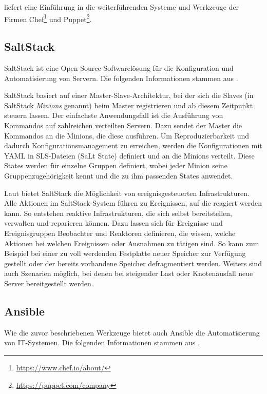 \autocite{chef-vs-puppet-revisited:online} liefert eine Einführung in die weiterführenden Systeme und Werkzeuge der Firmen Chef\footnote{\url{https://www.chef.io/about/}} und Puppet\footnote{\url{https://puppet.com/company}}.

\subsection{SaltStack}
\label{sub:saltstack}
SaltStack ist eine Open-Source-Softwarelösung für die Konfiguration und Automatisierung von Servern.
Die folgenden Informationen stammen aus \autocite{SaltStack:online}.

SaltStack basiert auf einer Master-Slave-Architektur, bei der sich die Slaves (in SaltStack \emph{Minions} genannt) beim Master registrieren und ab diesem Zeitpunkt steuern lassen.
Der einfachste Anwendungsfall ist die Ausführung von Kommandos auf zahlreichen verteilten Servern.
Dazu sendet der Master die Kommandos an die Minions, die diese ausführen.
Um Reproduzierbarkeit und dadurch Konfigurationsmanagement zu erreichen, werden die Konfigurationen mit YAML in SLS-Dateien (SaLt State) definiert und an die Minions verteilt.
Diese States werden für einzelne Gruppen definiert, wobei jeder Minion seine Gruppenzugehörigkeit kennt und die zu ihm passenden States anwendet.

Laut \autocite{SaltStack-Event:online} bietet SaltStack die Möglichkeit von ereignisgesteuerten Infrastrukturen.
Alle Aktionen im SaltStack-System führen zu Ereignissen, auf die reagiert werden kann.
So entstehen reaktive Infrastrukturen, die sich selbst bereitstellen, verwalten und reparieren können.
Dazu lassen sich für Ereignisse und Ereignisgruppen Beobachter und Reaktoren definieren, die wissen, welche Aktionen bei welchen Ereignissen oder Ausnahmen zu tätigen sind.
So kann zum Beispiel bei einer zu voll werdenden Festplatte neuer Speicher zur Verfügung gestellt oder der bereits vorhandene Speicher defragmentiert werden.
Weiters sind auch Szenarien möglich, bei denen bei steigender Last oder Knotenausfall neue Server bereitgestellt werden.

\subsection{Ansible}
\label{sub:ansible}
Wie die zuvor beschriebenen Werkzeuge bietet auch Ansible die Automatisierung von IT-Systemen.
Die folgenden Informationen stammen aus \autocite{Ansible:online}.

